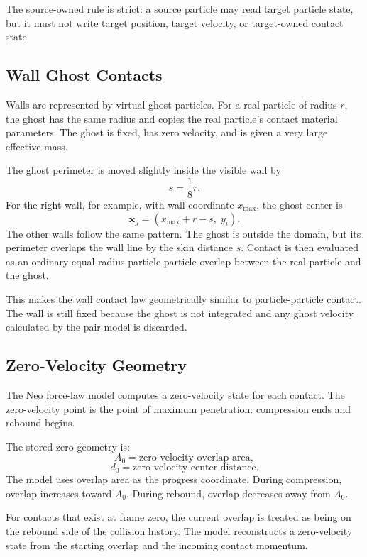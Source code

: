 The source-owned rule is strict: a source particle may read target particle
state, but it must not write target position, target velocity, or target-owned
contact state.

\subsection{Wall Ghost Contacts}

Walls are represented by virtual ghost particles.  For a real particle of
radius \(r\), the ghost has the same radius and copies the real particle's
contact material parameters.  The ghost is fixed, has zero velocity, and is
given a very large effective mass.

The ghost perimeter is moved slightly inside the visible wall by
\[
    s = \frac{1}{8}r .
\]
For the right wall, for example, with wall coordinate \(x_{\max}\), the ghost
center is
\[
    \mathbf{x}_g = (x_{\max} + r - s,\; y_i).
\]
The other walls follow the same pattern.  The ghost is outside the domain, but
its perimeter overlaps the wall line by the skin distance \(s\).  Contact is
then evaluated as an ordinary equal-radius particle-particle overlap between
the real particle and the ghost.

This makes the wall contact law geometrically similar to particle-particle
contact.  The wall is still fixed because the ghost is not integrated and any
ghost velocity calculated by the pair model is discarded.

\subsection{Zero-Velocity Geometry}

The Neo force-law model computes a zero-velocity state for each contact.  The
zero-velocity point is the point of maximum penetration: compression ends and
rebound begins.

The stored zero geometry is:
\[
    A_0 = \text{zero-velocity overlap area},
\]
\[
    d_0 = \text{zero-velocity center distance}.
\]
The model uses overlap area as the progress coordinate.  During compression,
overlap increases toward \(A_0\).  During rebound, overlap decreases away from
\(A_0\).

For contacts that exist at frame zero, the current overlap is treated as being
on the rebound side of the collision history.  The model reconstructs a
zero-velocity state from the starting overlap and the incoming contact
momentum.

